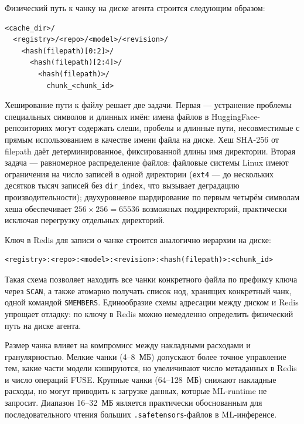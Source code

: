 Физический путь к чанку на диске агента строится следующим образом:

\begin{lstlisting}[numbers=none,frame=none,basicstyle=\small\ttfamily]
<cache_dir>/
  <registry>/<repo>/<model>/<revision>/
    <hash(filepath)[0:2]>/
      <hash(filepath)[2:4]>/
        <hash(filepath)>/
          chunk_<chunk_id>
\end{lstlisting}

Хеширование пути к файлу решает две задачи. Первая --- устранение проблемы специальных символов и длинных имён: имена файлов в HuggingFace-репозиториях могут содержать слеши, пробелы и длинные пути, несовместимые с прямым использованием в качестве имени файла на диске. Хеш SHA-256 от filepath даёт детерминированное, фиксированной длины имя директории. Вторая задача --- равномерное распределение файлов: файловые системы Linux имеют ограничения на число записей в одной директории (\texttt{ext4} --- до нескольких десятков тысяч записей без \texttt{dir\_index}, что вызывает деградацию производительности); двухуровневое шардирование по первым четырём символам хеша обеспечивает $256 \times 256 = 65536$ возможных поддиректорий, практически исключая перегрузку отдельных директорий.

Ключ в Redis для записи о чанке строится аналогично иерархии на диске:

\begin{lstlisting}[numbers=none,frame=none,basicstyle=\small\ttfamily]
<registry>:<repo>:<model>:<revision>:<hash(filepath)>:<chunk_id>
\end{lstlisting}

Такая схема позволяет находить все чанки конкретного файла по префиксу ключа через \texttt{SCAN}, а также атомарно получать список нод, хранящих конкретный чанк, одной командой \texttt{SMEMBERS}. Единообразие схемы адресации между диском и Redis упрощает отладку: по ключу в Redis можно немедленно определить физический путь на диске агента.

Размер чанка влияет на компромисс между накладными расходами и гранулярностью. Мелкие чанки (4--8~МБ) допускают более точное управление тем, какие части модели кэшируются, но увеличивают число метаданных в Redis и число операций FUSE. Крупные чанки (64--128~МБ) снижают накладные расходы, но могут приводить к загрузке данных, которые ML-runtime не запросит. Диапазон 16--32~МБ является практически обоснованным для последовательного чтения больших \texttt{.safetensors}-файлов в ML-инференсе.

